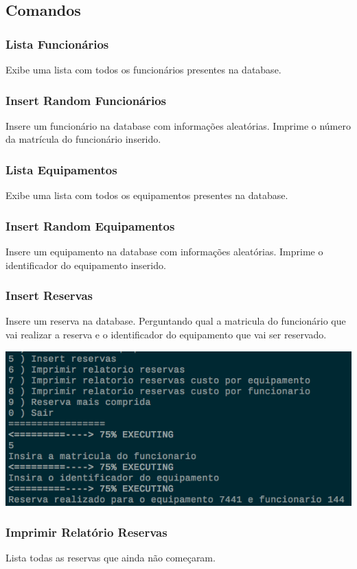 \documentclass[11pt]{article}
\begin{document}
\subsection{Comandos}
\label{sec:org09b0108}
\subsubsection{Lista Funcionários}
\label{sec:orgd98e27b}
Exibe uma lista com todos os funcionários presentes na database.
\subsubsection{Insert Random Funcionários}
\label{sec:org12d99af}
Insere um funcionário na database com informações aleatórias. 
Imprime o número da matrícula do funcionário inserido.
\subsubsection{Lista Equipamentos}
\label{sec:org0ba8dfa}
Exibe uma lista com todos os equipamentos presentes na database.
\subsubsection{Insert Random Equipamentos}
\label{sec:org92765fc}
Insere um equipamento na database com informações aleatórias. 
Imprime o identificador do equipamento inserido.
\subsubsection{Insert Reservas}
\label{sec:org384ee2e}
Insere um reserva na database. Perguntando qual a matricula do
funcionário que vai realizar a reserva e o identificador do
equipamento que vai ser reservado.
\begin{center}
\includegraphics[width=.9\linewidth]{./static/reservas.png}
\end{center}
\subsubsection{Imprimir Relatório Reservas}
\label{sec:orga8fb190}
Lista todas as reservas que ainda não começaram. 
\end{document}
